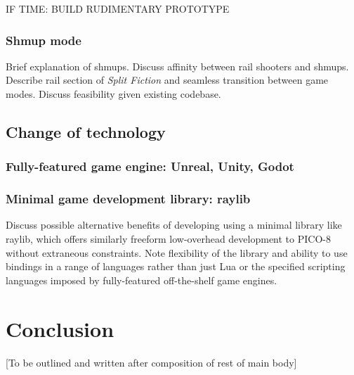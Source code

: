 \documentclass{article}
\begin{document}
IF TIME: BUILD RUDIMENTARY PROTOTYPE

\subsubsection*{Shmup mode}
Brief explanation of shmups. Discuss affinity between rail shooters and shmups. Describe rail section
of \textit{Split Fiction} and seamless transition between game modes. Discuss feasibility given
existing codebase.

\subsection{Change of technology}
\subsubsection*{Fully-featured game engine: Unreal, Unity, Godot}
\subsubsection*{Minimal game development library: raylib}
Discuss possible alternative benefits of developing using a minimal library like raylib,
which offers similarly freeform low-overhead development to PICO-8 without extraneous
constraints. Note flexibility of the library and ability to use bindings in a range of
languages rather than just Lua or the specified scripting languages imposed by fully-featured
off-the-shelf game engines.


\section{Conclusion}
[To be outlined and written after composition of rest of main body]

\printbibliography
\end{document}
